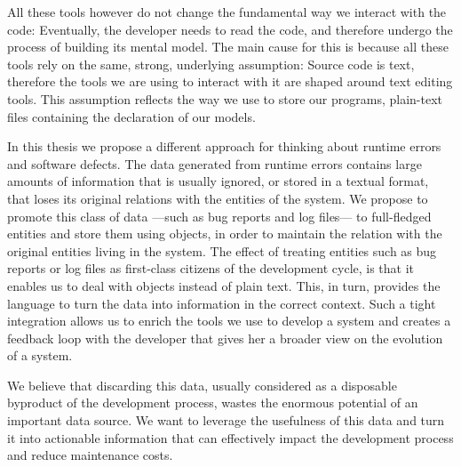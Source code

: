 All these tools however do not change the fundamental way we interact with the code: Eventually, the developer needs to read the code, and therefore undergo the process of building its mental model.
The main cause for this is because all these tools rely on the same, strong, underlying assumption: Source code is text, therefore the tools we are using to interact with it are shaped around text editing tools.
This assumption reflects the way we use to store our programs, \ie plain-text files containing the declaration of our models.


In this thesis we propose a different approach for thinking about runtime errors and software defects.
The data generated from runtime errors contains large amounts of information that is usually ignored, or stored in a textual format, that loses its original relations with the entities of the system.
We propose to promote this class of data ---such as bug reports and log files--- to full-fledged entities and store them using objects, in order to maintain the relation with the original entities living in the system.
The effect of treating entities such as bug reports or log files as first-class citizens of the development cycle, is that it enables us to deal with objects instead of plain text.
This, in turn, provides the language to turn the data into information in the correct context.
Such a tight integration allows us to enrich the tools we use to develop a system and creates a feedback loop with the developer that gives her a broader view on the evolution of a system.

We believe that discarding this data, usually considered as a disposable byproduct of the development process, wastes the enormous potential of an important data source.
We want to leverage the usefulness of this data and turn it into actionable information that can effectively impact the development process and reduce maintenance costs.

